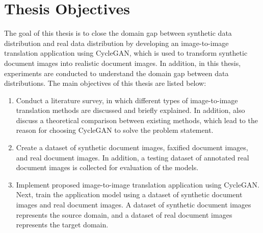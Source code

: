 \section{Thesis Objectives}\label{thesisobjectives}
The goal of this thesis is to close the domain gap between synthetic data distribution and real data distribution by developing an image-to-image translation application using \ac{CycleGAN}, which is used to transform synthetic document images into realistic document images. In addition, in this thesis, experiments are conducted to understand the domain gap between data distributions. The main objectives of this thesis are listed below:
\begin{enumerate}
\item Conduct a literature survey, in which different types of image-to-image translation methods are discussed and briefly explained. In addition, also discuss a theoretical comparison between existing methods, which lead to the reason for choosing \ac{CycleGAN} to solve the problem statement. 

\item Create a dataset of synthetic document images, faxified document images, and real document images. In addition, a testing dataset of annotated real document images is collected for evaluation of the models.

\item Implement proposed image-to-image translation application using \ac{CycleGAN}. Next, train the application model using a dataset of synthetic document images and real document images. A dataset of synthetic document images represents the source domain, and a dataset of real document images represents the target domain.


\end{enumerate}
